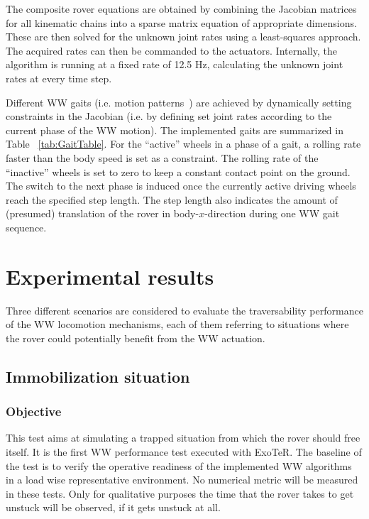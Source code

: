 \documentclass[a4paper,twocolumn]{esapub2005} %
\begin{document}
The composite rover equations are obtained by combining the Jacobian
matrices for all kinematic chains into a sparse matrix equation of appropriate
dimensions. These are then solved for the unknown joint rates using a 
least-squares approach. The acquired rates can then be commanded to the 
actuators. Internally, the algorithm is running at a fixed rate of 12.5 Hz, 
calculating the unknown joint rates at every time step.

Different WW gaits (i.e. motion patterns~\cite{LucWalkingGaits}) are achieved 
by dynamically setting constraints in the Jacobian (i.e. by defining set joint 
rates according to the current phase of the WW motion). The implemented gaits 
are summarized in Table ~\ref{tab:GaitTable}. For the ``active'' wheels in a 
phase of a gait, a rolling rate faster than the body speed is set as a 
constraint. The rolling rate of the ``inactive'' wheels is set to zero to keep 
a constant contact point on the ground. The switch to the next phase is induced 
once the currently active driving wheels reach the specified step length. The 
step length also indicates the amount of (presumed) translation of the rover in 
body-$x$-direction during one WW gait sequence.


\section{Experimental results}

Three different scenarios are considered to evaluate the traversability
performance of the WW locomotion mechanisms, each of them referring
to situations where the rover could potentially benefit from the WW
actuation.

\subsection{Immobilization situation} 

\subsubsection{Objective} This test aims at simulating a trapped situation from
which the rover should free itself. It is the first WW performance test
executed with ExoTeR. The baseline of the test is to verify the operative
readiness of the implemented WW algorithms in a load wise representative
environment.  No numerical metric will be measured in these tests. Only for
qualitative purposes the time that the rover takes to get unstuck will be
observed, if it gets unstuck at all.
\end{document}
